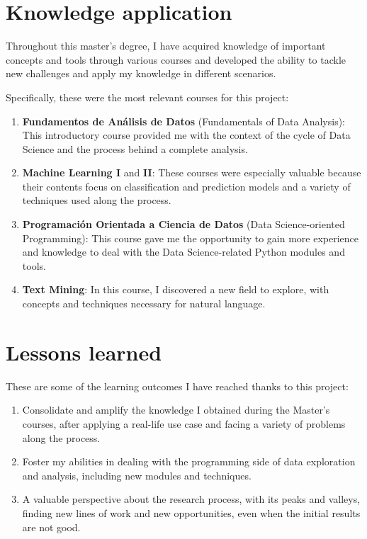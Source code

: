 \documentclass[a4paper, 12pt]{book}
\begin{document}
\section{Knowledge application}
\label{sec:knowledge-application}

Throughout this master's degree, I have acquired knowledge of important concepts and tools through various courses and developed the ability to tackle new challenges and apply my knowledge in different scenarios.

Specifically, these were the most relevant courses for this project:
\begin{enumerate}
\item \textbf{Fundamentos de Análisis de Datos} (Fundamentals of Data Analysis): This introductory course provided me with the context of the cycle of Data Science and the process behind a complete analysis.
\item \textbf{Machine Learning I} and \textbf{II}: These courses were especially valuable because their contents focus on classification and prediction models and a variety of techniques used along the process.
\item \textbf{Programación Orientada a Ciencia de Datos} (Data Science-oriented Programming): This course gave me the opportunity to gain more experience and knowledge to deal with the Data Science-related Python modules and tools.
\item \textbf{Text Mining}: In this course, I discovered a new field to explore, with concepts and techniques necessary for natural language.
\end{enumerate}

\section{Lessons learned}
\label{sec:lessons-learned}

These are some of the learning outcomes I have reached thanks to this project:

\begin{enumerate}
  \item Consolidate and amplify the knowledge I obtained during the Master's courses, after applying a real-life use case and facing a variety of problems along the process.
  \item Foster my abilities in dealing with the programming side of data exploration and analysis, including new modules and techniques.
  \item A valuable perspective about the research process, with its peaks and valleys, finding new lines of work and new opportunities, even when the initial results are not good.
\end{enumerate}
\end{document}
